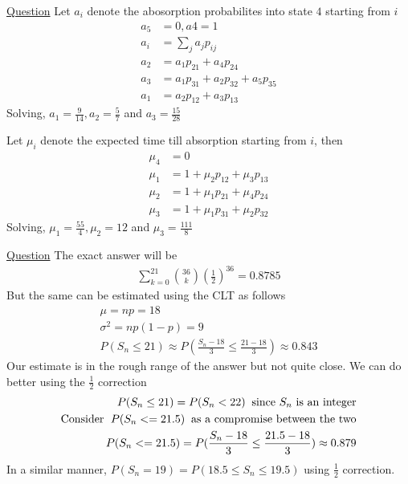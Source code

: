 \documentclass[11pt, a4paper]{article}
\begin{document}
\begin{enumerate}
        \hypertarget{a_absorbmarkov}{\item} \hyperlink{q_absorbmarkov}{Question}\newline
        Let $a_{i}$ denote the abosorption probabilites into state $4$ starting from $i$
        \begin{align*}
            a_{5} &= 0, a{4} = 1 \\
            a_{i} &= \sum_{j} a_{j}p_{ij}\\
            a_{2} &= a_{1}p_{21} + a_{4}p_{24}\\
            a_{3} &= a_{1}p_{31} + a_{2}p_{32} + a_{5}p_{35}\\
            a_{1} &= a_{2}p_{12} + a_{3}p_{13}
        \end{align*}
        Solving, $a_{1} = \frac{9}{14}, a_{2} = \frac{5}{7}$ and $a_{3} = \frac{15}{28}$ \newline
        
        Let $\mu_{i}$ denote the expected time till absorption starting from $i$, then
        \begin{align*}
            \mu_{4} &= 0 \\
            \mu_{1} &= 1 + \mu_{2}p_{12} + \mu_{3}p_{13} \\
            \mu_{2} &= 1 + \mu_{1}p_{21} + \mu_{4}p_{24} \\
            \mu_{3} &= 1 + \mu_{1}p_{31} + \mu_{2}p_{32}
        \end{align*}
        Solving, $\mu_{1} = \frac{55}{4}, \mu_{2} = 12$ and $\mu_{3} = \frac{111}{8}$


        \hypertarget{a_binclt}{\item} \hyperlink{q_binclt}{Question}
        The exact answer will be
        \begin{align*}
            \sum_{k=0}^{21}\binom{36}{k}(\frac{1}{2})^{36} = 0.8785
        \end{align*}
        But the same can be estimated using the CLT as follows
        \begin{align*}
            \mu = np = 18\\
            \sigma^{2} = np(1-p) = 9\\
            P(S_{n} \leq 21) \approx P(\frac{S_{n} - 18}{3} \leq \frac{21-18}{3}) \approx 0.843
        \end{align*}
        Our estimate is in the rough range of the answer but not quite close. We can do better using the $\frac{1}{2}$ correction
        \begin{align*}
            P(S_{n} \leq 21) = P(S_{n} < 22) \text{\;\;since $S_{n}$ is an integer}\\
            \text{Consider \;}P(S_{n} <= 21.5) \text{\;\;as a compromise between the two}\\
            P(S_{n} <= 21.5) = P(\frac{S_{n} - 18}{3} \leq \frac{21.5 - 18}{3}) \approx 0.879
        \end{align*}
        In a similar manner, $P(S_{n}=19) = P(18.5 \leq S_{n} \leq 19.5)$ using $\frac{1}{2}$ correction.



\end{enumerate}
\end{document}
